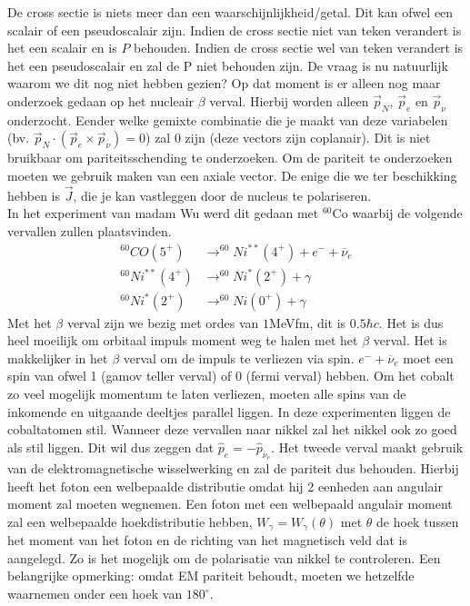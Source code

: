 \documentclass[../main.tex]{subfiles}
\begin{document}
De cross sectie is niets meer dan een waarschijnlijkheid/getal. Dit kan ofwel een scalair of een pseudoscalair zijn. Indien de cross sectie niet van teken verandert is het een scalair en is $P$ behouden. Indien de cross sectie wel van teken verandert is het een pseudoscalair en zal de P niet behouden zijn. De vraag is nu natuurlijk waarom we dit nog niet hebben gezien? Op dat moment is er alleen nog maar onderzoek gedaan op het nucleair $\beta$ verval. Hierbij worden alleen $\vec{p}_N$, $\vec{p}_e$ en $\vec{p}_\nu$ onderzocht. Eender welke gemixte combinatie die je maakt van deze variabelen (bv. $\vec{p}_N\cdot(\vec{p}_e\times\vec{p}_\nu)=0$) zal 0 zijn (deze vectors zijn coplanair). Dit is niet bruikbaar om pariteitsschending te onderzoeken. Om de pariteit te onderzoeken moeten we gebruik maken van een axiale vector. De enige die we ter beschikking hebben is $\vec{J}$, die je kan vastleggen door de nucleus te polariseren.\\
In het experiment van madam Wu werd dit gedaan met $^{60}$Co waarbij de volgende vervallen zullen plaatsvinden.
\begin{equation}
    \begin{aligned}
        \label{eq:wu_verval}
        ^{60}CO(5^+) &\rightarrow ^{60}Ni^{**}(4^+) + e^- + \overline \nu_e\\
        ^{60}Ni^{**}(4^+) &\rightarrow ^{60}Ni^*(2^+) + \gamma\\
        ^{60}Ni^*(2^+) &\rightarrow ^{60}Ni(0^+) + \gamma
    \end{aligned}
\end{equation}
Met het $\beta$ verval zijn we bezig met ordes van $1$MeVfm, dit is $0.5\hbar c$. Het is dus heel moeilijk om orbitaal impuls moment weg te halen met het $\beta$ verval. Het is makkelijker in het $\beta$ verval om de impuls te verliezen via spin. $e^- + \overline \nu_e$ moet een spin van ofwel 1 (gamov teller verval) of 0 (fermi verval) hebben. Om het cobalt zo veel mogelijk momentum te laten verliezen, moeten alle spins van de inkomende en uitgaande deeltjes parallel liggen. In deze experimenten liggen de cobaltatomen stil. Wanneer deze vervallen naar nikkel zal het nikkel ook zo goed als stil liggen. Dit wil dus zeggen dat $\hat{p}_e = -\hat{p}_{\overline \nu_e}$. Het tweede verval maakt gebruik van de elektromagnetische wisselwerking en zal de pariteit dus behouden. Hierbij heeft het foton een welbepaalde distributie omdat hij 2 eenheden aan angulair moment zal moeten wegnemen. Een foton met een welbepaald angulair moment zal een welbepaalde hoekdistributie hebben, $W_\gamma = W_\gamma(\theta)$ met $\theta$ de hoek tussen het moment van het foton en de richting van het magnetisch veld dat is aangelegd. Zo is het mogelijk om de polarisatie van nikkel te controleren. Een belangrijke opmerking: omdat EM pariteit behoudt, moeten we hetzelfde waarnemen onder een hoek van $180^\circ$.
\end{document}
